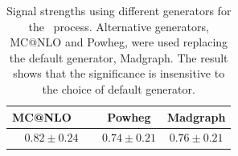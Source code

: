 %
\begin{table}[htp] 
\begin{center} 
\begin{tabular}{c|c|c} 
\hline 
MC@NLO   &  Powheg & Madgraph \\
\hline \hline 
$0.82 \pm 0.24$ & $0.74 \pm 0.21$ & $0.76 \pm 0.21$ \\
\hline 
\end{tabular} 
\caption{ Signal strengths 
using different generators for the \qqww\ process. Alternative generators,
MC@NLO and Powheg, were used replacing the default generator, Madgraph.
The result shows that the significance is insensitive to the choice
of default generator.} 
\label{tab:mu_diffgenerator} 
\end{center} 
\end{table} 



